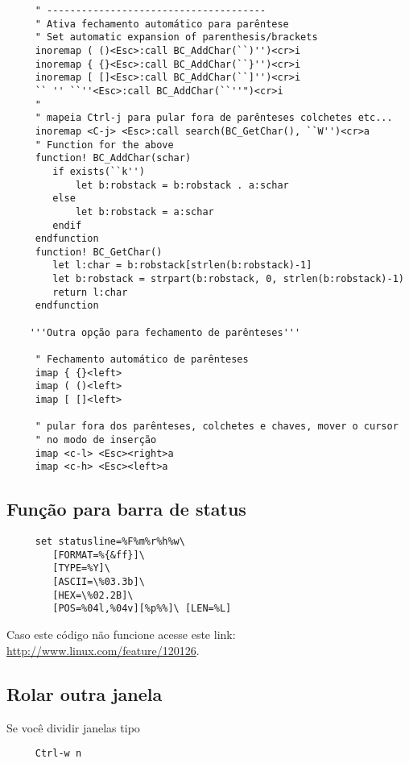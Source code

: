\begin{verbatim}
     " --------------------------------------
     " Ativa fechamento automático para parêntese
     " Set automatic expansion of parenthesis/brackets
     inoremap ( ()<Esc>:call BC_AddChar(``)'')<cr>i
     inoremap { {}<Esc>:call BC_AddChar(``}'')<cr>i
     inoremap [ []<Esc>:call BC_AddChar(``]'')<cr>i
     `` '' ``''<Esc>:call BC_AddChar(``''")<cr>i
     "
     " mapeia Ctrl-j para pular fora de parênteses colchetes etc...
     inoremap <C-j> <Esc>:call search(BC_GetChar(), ``W'')<cr>a
     " Function for the above
     function! BC_AddChar(schar)
        if exists(``k'')
            let b:robstack = b:robstack . a:schar
        else
            let b:robstack = a:schar
        endif
     endfunction
     function! BC_GetChar()
        let l:char = b:robstack[strlen(b:robstack)-1]
        let b:robstack = strpart(b:robstack, 0, strlen(b:robstack)-1)
        return l:char
     endfunction
    
    '''Outra opção para fechamento de parênteses'''
    
     " Fechamento automático de parênteses
     imap { {}<left>
     imap ( ()<left>
     imap [ []<left>
    
     " pular fora dos parênteses, colchetes e chaves, mover o cursor
     " no modo de inserção
     imap <c-l> <Esc><right>a
     imap <c-h> <Esc><left>a
\end{verbatim}

\subsection{Função para barra de status}\label{Função para barra de status}

\begin{verbatim}
     set statusline=%F%m%r%h%w\
        [FORMAT=%{&ff}]\
        [TYPE=%Y]\
        [ASCII=\%03.3b]\
        [HEX=\%02.2B]\
        [POS=%04l,%04v][%p%%]\ [LEN=%L]
\end{verbatim}
Caso este código não funcione acesse este link: \url{http://www.linux.com/feature/120126}.


\subsection{Rolar outra janela}\label{Rolar outra janela}

Se você dividir janelas tipo

\begin{verbatim}
     Ctrl-w n
\end{verbatim}

